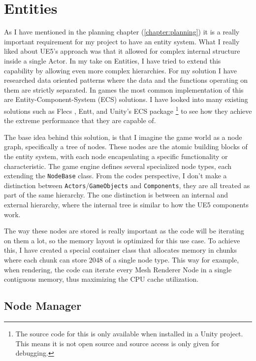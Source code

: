 \chapter{Entities}


As I have mentioned in the planning chapter (\autoref{chapter:planning}) it is a really important requirement for my project to have an entity system. What I really liked about UE5's approach was that it allowed for complex internal structure inside a single Actor. In my take on Entities, I have tried to extend this capability by allowing even more complex hierarchies. For my solution I have researched data oriented patterns where the data and the functions operating on them are strictly separated. In games the most common implementation of this are Entity-Component-System (ECS) solutions. I have looked into many existing solutions such as Flecs\cite{flecs} \cite{flecs-ecs}, Entt\cite{entt}, and Unity's ECS package\cite{unity-ecs} \footnote{The source code for this is only available when installed in a Unity project. This means it is not open source and source access is only given for debugging.} to see how they achieve the extreme performance that they are capable of.

The base idea behind this solution, is that I imagine the game world as a node graph, specifically a tree of nodes. These nodes are the atomic building blocks of the entity system, with each node encapsulating a specific functionality or characteristic. The game engine defines several specialized node types, each extending the \verb|NodeBase| class. From the codes perspective, I don't make a distinction between \verb|Actors|/\verb|GameObjects| and \verb|Components|, they are all treated as part of the same hierarchy. The one distinction is between an internal and external hierarchy, where the internal tree is similar to how the UE5 components work.

The way these nodes are stored is really important as the code will be iterating on them a lot, so the memory layout is optimized for this use case. To achieve this, I have created a special container class that allocates memory in chunks where each chunk can store 2048 of a single node type. This way for example, when rendering, the code can iterate every Mesh Renderer Node in a single contiguous memory, thus maximizing the CPU cache utilization.


\section{Node Manager}


